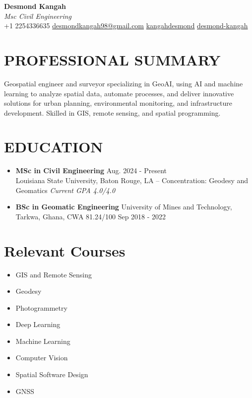 \documentclass[a4paper,10pt]{article}
\begin{document}
\sloppy %

\begin{center}
    {\huge \textbf{Desmond Kangah}}\\
    \textit{Msc Civil Engineering}\\
     +1 2254336635 \quad
     \href{desmondkangah98@gmail.com}{desmondkangah98@gmail.com} \quad
     \href{https://github.com/kangahdesmond}{kangahdesmond}
     \href{https://www.linkedin.com/in/desmond-kangah-629b9a27b/}{desmond-kangah}
\end{center}

\section*{PROFESSIONAL SUMMARY}
Geospatial engineer and surveyor specializing in GeoAI, using AI and machine learning 
to analyze spatial data, automate processes, and deliver innovative solutions for 
urban planning, environmental monitoring, and infrastructure development. 
Skilled in GIS, remote sensing, and spatial programming.

\section*{EDUCATION}
\begin{itemize}[leftmargin=*, noitemsep]
    \item \textbf{MSc in Civil Engineering} \hfill Aug. 2024 {-} Present \\
    Louisiana State University, Baton Rouge, LA {--} Concentration: Geodesy and Geomatics \qquad
    \textit{Current GPA 4.0/4.0\@}
    \item \textbf{BSc in Geomatic Engineering}  \quad
    University of Mines and Technology, Tarkwa, Ghana, CWA 81.24/100 \hfill Sep 2018 {-} 2022
\end{itemize}

 \section*{Relevant Courses}
 \begin{multicols}{4} %
 \begin{itemize}[leftmargin=*]
     \item GIS and Remote Sensing
     \item Geodesy
     \item Photogrammetry
     \item Deep Learning
     \item Machine Learning
     \item Computer Vision
     \item Spatial Software Design
     \item GNSS
 \end{itemize}
 \end{multicols}
\end{document}
